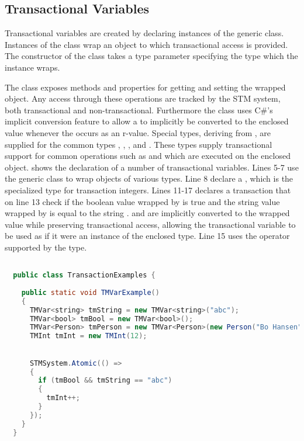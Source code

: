 \subsection{Transactional Variables}
Transactional variables are created by declaring instances of the generic  class. Instances of the  class wrap an object to which transactional access is provided.  The constructor of the  class takes a type parameter specifying the type which the  instance wraps.

The  class exposes methods and properties for getting and setting the wrapped object. Any access through these operations are tracked by the \ac{STM} system, both transactional and non-transactional. Furthermore the  class uses C\#'s implicit conversion feature to allow a  to implicitly be converted to the enclosed value whenever the  occurs as an r-value. Special types, deriving from , are supplied for the common types , , ,   and . These types supply transactional support for common operations such as \bscode{++} and \bscode{--} which are executed on the enclosed object.   shows the declaration of a number of transactional variables. Lines 5-7 use the generic  class to wrap objects of various types. Line 8 declare a , which is the specialized type for transaction integers. Lines 11-17 declares a transaction that on line 13 check if the boolean value wrapped by  is true and the string value wrapped by  is equal to the string .  and  are implicitly converted to the wrapped value while preserving transactional access, allowing the transactional variable to be used as if it were an instance of the enclosed type. Line 15 uses the \bscode{++} operator supported by the  type.
\begin{lstlisting}[label=lst:library_tmvar,
  caption={Library Transactional Variable},
  language=Java,  
  showspaces=false,
  showtabs=false,
  breaklines=true,
  showstringspaces=false,
  breakatwhitespace=true,
  commentstyle=\color{greencomments},
  keywordstyle=\color{bluekeywords},
  stringstyle=\color{redstrings},
  morekeywords={atomic, retry, orElse, var, get, set, string, bool}]  % Start your code-block

  public class TransactionExamples {
      
    public static void TMVarExample()
    {
      TMVar<string> tmString = new TMVar<string>("abc");
      TMVar<bool> tmBool = new TMVar<bool>();
      TMVar<Person> tmPerson = new TMVar<Person>(new Person("Bo Hansen", 57));
      TMInt tmInt = new TMInt(12);
           

      STMSystem.Atomic(() =>
      {
        if (tmBool && tmString == "abc")
        {
          tmInt++;
        }
      });
    }
  }
\end{lstlisting}
